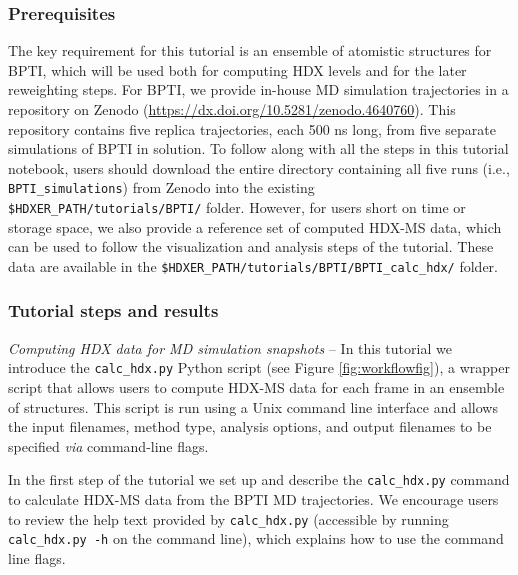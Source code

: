 \documentclass[9pt,tutorial,ASAPversion]{livecoms}
\begin{document}
\subsubsection{Prerequisites} 
The key requirement for this tutorial is an ensemble of atomistic structures for BPTI, which will be used both for computing HDX levels and for the later reweighting steps. 
For BPTI, we provide in-house MD simulation trajectories in a repository on Zenodo (\url{https://dx.doi.org/10.5281/zenodo.4640760}). 
This repository contains five replica trajectories, each 500 ns long, from five separate simulations of BPTI in solution. 
To follow along with all the steps in this tutorial notebook, users should download the entire directory containing all five runs (i.e., \texttt{BPTI\_simulations}) from Zenodo into the existing \texttt{\$HDXER\_PATH/tutorials/BPTI/} folder. 
However, for users short on time or storage space, we also provide a reference set of computed HDX-MS data, which can be used to follow the visualization and analysis steps of the tutorial. 
These data are available in the \texttt{\$HDXER\_PATH/tutorials/BPTI/BPTI\_calc\_hdx/} folder. 

\subsubsection{Tutorial steps and results}\label{calc_hdx_py_sect}

\noindent
\textit{Computing HDX data for MD simulation snapshots} -- In this tutorial we introduce the \texttt{calc\_hdx.py} Python script (see Figure \ref{fig:workflowfig}), a wrapper script that allows users to compute HDX-MS data for each frame in an ensemble of structures. 
This script is run using a Unix command line interface and allows the input filenames, method type, analysis options, and output filenames to be specified \textit{via} command-line flags.

In the first step of the tutorial we set up and describe the \texttt{calc\_hdx.py} command to calculate HDX-MS data from the BPTI MD trajectories.
We encourage users to review the help text provided by \texttt{calc\_hdx.py} (accessible by running \texttt{calc\_hdx.py -h} on the command line), which explains how to use the command line flags.
\end{document}
